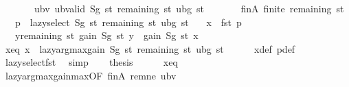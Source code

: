\begin{isabellebody}
\ \ \ \ \ \ \ ubv{\isacharcolon}{\kern0pt}\ {\isachardoublequoteopen}ub{\isacharunderscore}{\kern0pt}valid\ {\isacharparenleft}{\kern0pt}Sg\ st{\isacharparenright}{\kern0pt}\ {\isacharparenleft}{\kern0pt}remaining\ st{\isacharparenright}{\kern0pt}\ {\isacharparenleft}{\kern0pt}ubg\ st{\isacharparenright}{\kern0pt}{\isachardoublequoteclose}\isanewline
\ \ \ \ \ \ \ finA{\isacharcolon}{\kern0pt}\ {\isachardoublequoteopen}finite\ {\isacharparenleft}{\kern0pt}remaining\ st{\isacharparenright}{\kern0pt}{\isachardoublequoteclose}\isanewline
\ \ \ {\isachardoublequoteopen}p\ {\isasymequiv}\ lazy{\isacharunderscore}{\kern0pt}select\ {\isacharparenleft}{\kern0pt}Sg\ st{\isacharparenright}{\kern0pt}\ {\isacharparenleft}{\kern0pt}remaining\ st{\isacharparenright}{\kern0pt}\ {\isacharparenleft}{\kern0pt}ubg\ st{\isacharparenright}{\kern0pt}{\isachardoublequoteclose}\isanewline
\ \ \ {\isachardoublequoteopen}x\ {\isasymequiv}\ fst\ p{\isachardoublequoteclose}\isanewline
\ \ \ {\isachardoublequoteopen}{\isasymforall}y{\isasymin}remaining\ st{\isachardot}{\kern0pt}\ gain\ {\isacharparenleft}{\kern0pt}Sg\ st{\isacharparenright}{\kern0pt}\ y\ {\isasymle}\ gain\ {\isacharparenleft}{\kern0pt}Sg\ st{\isacharparenright}{\kern0pt}\ x{\isachardoublequoteclose}\isanewline
%
\isadelimproof
%
\endisadelimproof
%
\isatagproof
{}\isamarkupfalse%
\ {\isacharminus}{\kern0pt}\isanewline
\ \ \isamarkupfalse%
\ x{\isacharunderscore}{\kern0pt}eq{\isacharcolon}{\kern0pt}\ {\isachardoublequoteopen}x\ {\isacharequal}{\kern0pt}\ lazy{\isacharunderscore}{\kern0pt}argmax{\isacharunderscore}{\kern0pt}gain\ {\isacharparenleft}{\kern0pt}Sg\ st{\isacharparenright}{\kern0pt}\ {\isacharparenleft}{\kern0pt}remaining\ st{\isacharparenright}{\kern0pt}\ {\isacharparenleft}{\kern0pt}ubg\ st{\isacharparenright}{\kern0pt}{\isachardoublequoteclose}\isanewline
\ \ \ \ \isamarkupfalse%
\ x{\isacharunderscore}{\kern0pt}def\ p{\isacharunderscore}{\kern0pt}def\ \isamarkupfalse%
\ lazy{\isacharunderscore}{\kern0pt}select{\isacharunderscore}{\kern0pt}fst\ \isamarkupfalse%
\ simp\isanewline
\ \ \isamarkupfalse%
\ {\isacharquery}{\kern0pt}thesis\isanewline
\ \ \ \ \isamarkupfalse%
\ x{\isacharunderscore}{\kern0pt}eq\isanewline
\ \ \ \ \isamarkupfalse%
\ lazy{\isacharunderscore}{\kern0pt}argmax{\isacharunderscore}{\kern0pt}gain{\isacharunderscore}{\kern0pt}max{\isacharbrackleft}{\kern0pt}OF\ finA\ rem{\isacharunderscore}{\kern0pt}ne\ ubv{\isacharbrackright}{\kern0pt}\ \isakeywordONE{{\isachardot}{\kern0pt}}\isamarkupfalse%
\isanewline
{}\isamarkupfalse%
%
\endisatagproof
{\isafoldproof}%
%
\isadelimproof
\isanewline
%
\endisadelimproof
\isanewline
{}\isamarkupfalse%
\isanewline
%
\isadelimtheory
\isanewline
%
\endisadelimtheory
%
\isatagtheory
{}\isamarkupfalse%
%
\endisatagtheory
{\isafoldtheory}%
%
\isadelimtheory
%
\endisadelimtheory
%
\end{isabellebody}%
